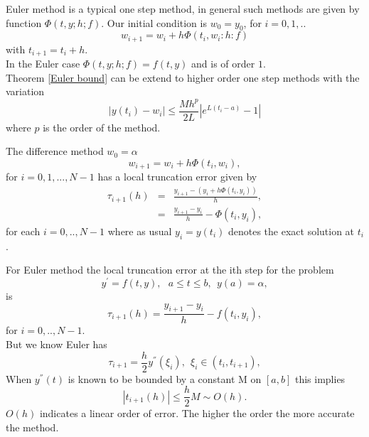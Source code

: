 Euler method is a typical one step method, in general such methods are given by
function $\Phi(t,y;h;f)$. Our initial condition is $w_0=y_0$, for $i=0,1,..$
\[w_{i+1}=w_i+h\Phi(t_i,w_i:h:f)\]
with $t_{i+1}=t_i+h$.\\
In the Euler case $\Phi(t,y;h;f)=f(t,y)$ and is of order $1$.\\
Theorem \ref{Euler bound} can be extend to higher order one step methods with the variation 
\[ |y(t_i)-w_i| \leq \frac{Mh^p}{2L}|e^{L(t_i-a)}-1| \]
where $p$ is the order of the method.
\begin{definition}
The difference method $w_0=\alpha$
\[w_{i+1}=w_i+h\Phi(t_i,w_i),\]
for $i=0,1,...,N-1$ has a local truncation error given by
\begin{eqnarray*}
\tau_{i+1}(h) &=&\frac{y_{i+1}-(y_i+h\Phi(t_i,y_i))}{h},\\ 
&=&\frac{y_{i+1}-y_{i}}{h} -\Phi(t_i,y_i),
\end{eqnarray*}
for each $i=0,..,N-1$ where as usual $y_i=y(t_i)$ denotes the exact solution
at $t_i$.
\end{definition}
For Euler method the local truncation error at the ith step for the problem
\[ y^{'} = f(t,y), \ \ \ a\leq t \leq b, \ \ y(a)=\alpha, \]
is
\[\tau_{i+1}(h) =\frac{y_{i+1}-y_{i}}{h} -f(t_i,y_i), \]
for $i=0,..,N-1$.\\
But we know Euler has \[\tau_{i+1}=\frac{h}{2}y^{''}(\xi_i), \ \ \xi_i \in (t_i,t_{i+1}),\]
When $y^{''}(t)$ is known to be bounded by a constant M on $[a,b]$ this implies
\[|t_{i+1}(h)| \leq \frac{h}{2}M \sim O(h). \]
$O(h)$ indicates a linear order of error. The higher the order the more accurate the method.
\newpage
